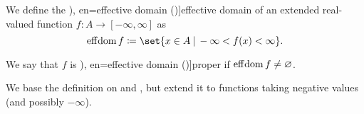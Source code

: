 \begin{definition}\label{def:effective_domain}\mimprovised
  We define the \term[ru=эффективное множество (\cite[50]{ПоловинкинБалашов2007ВыпуклыйАнализ}), en=effective domain (\cite[30]{Clarke2013OptimalControl})]{effective domain} of an extended real-valued function \( f: A \to [-\infty, \infty] \) as
  \begin{equation}\label{eq:def:effective_domain}
    \eff\dom f \coloneqq \set{ x \in A \given -\infty < f(x) < \infty }.
  \end{equation}

  We say that \( f \) is \term[ru=эффективное множество (\cite[50]{ПоловинкинБалашов2007ВыпуклыйАнализ}), en=effective domain (\cite[30]{Clarke2013OptimalControl})]{proper} if \( \operatorname*{eff\negthinspace\operatorname{dom}} f \neq \varnothing \).
\end{definition}
\begin{comments}
  \item We base the definition on \cite[30]{Clarke2013OptimalControl} and \cite[50]{ПоловинкинБалашов2007ВыпуклыйАнализ}, but extend it to functions taking negative values (and possibly \( -\infty \)).
\end{comments}
